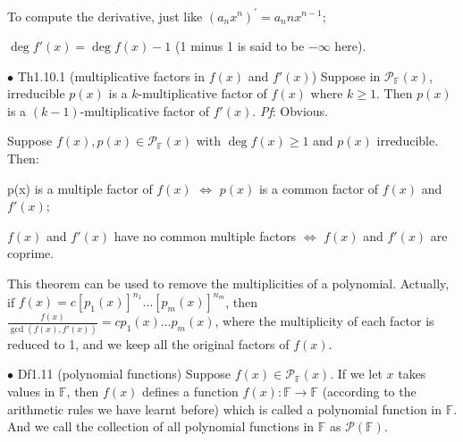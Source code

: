 \documentclass{article}
\begin{document}
\begin{Rmk}{}
    \begin{compactitem}
        \item To compute the derivative, just like $(a_nx^n)^\prime = a_nnx^{n-1}$;
        \item \textcolor{Th}{$\deg f'(x) = \deg f(x) -1$ (1 minus 1 is said to be $-\infty$ here).}
    \end{compactitem}
\end{Rmk}

\begin{Th}{$\bullet$ Th1.10.1 (multiplicative factors in $f(x)$ and $f'(x)$)}
    Suppose in $\mathcal{P}_\mathbb{F}(x)$, irreducible $p(x)$ is a $k$-multiplicative factor of $f(x)$ where $k\geq 1$. Then $p(x)$ is a $(k-1)$-multiplicative factor of $f'(x)$.
    \tcblower
    \textit{Pf}: Obvious.
\end{Th}

\begin{Rmk}{}
    \textcolor{Th}{Suppose $f(x), p(x)\in \mathcal{P}_\mathbb{F}(x)$ with $\deg f(x)\geq 1$ and $p(x)$ irreducible. Then:
    \begin{compactitem}
        \item p(x) is a multiple factor of $f(x)$ $\Leftrightarrow$ $p(x)$ is a common factor of $f(x)$ and $f'(x)$;
        \item $f(x)$ and $f'(x)$ have no common multiple factors $\Leftrightarrow$ $f(x)$ and $f'(x)$ are coprime.
    \end{compactitem}}
    This theorem can be used to remove the multiplicities of a polynomial. Actually, if $f(x) = c[p_1(x)]^{n_1} \dots [p_m(x)]^{n_m}$, then $\frac{f(x)}{\gcd(f(x), f'(x))} = cp_1(x)\dots p_m(x)$, where the multiplicity of each factor is reduced to 1, and we keep all the original factors of $f(x)$.
\end{Rmk}

\begin{Df}{$\bullet$ Df1.11 (polynomial functions)}
    Suppose $f(x)\in\mathcal{P}_\mathbb{F}(x)$. If we let $x$ takes values in $\mathbb{F}$, then $f(x)$ defines a function $f(x): \mathbb{F}\rightarrow\mathbb{F}$ (according to the arithmetic rules we have learnt before) which is called a polynomial function in $\mathbb{F}$. And we call the collection of all polynomial functions in $\mathbb{F}$ as $\mathcal{P}(\mathbb{F})$.
\end{Df}
\end{document}
